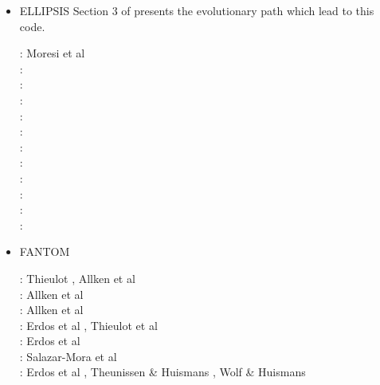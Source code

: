 \begin{itemize}
\item {\codefont ELLIPSIS} 
Section 3 of \cite{qums07} presents the evolutionary path which lead to this code.

{\small
\noindent
\twothousandone: Moresi et al \cite{modm01}\\
\twothousandthree: \cite{modm03}\cite{wibm03}\cite{mumc03}\cite{wemv03}\cite{onmo03}\cite{onml03}\\
\twothousandfour: \cite{wijns2004}\\
\twothousandfive: \cite{wiwg05}\cite{onml05}\cite{onmj05}\\
\twothousandsix: \cite{onmm06} \\
\twothousandseven: \cite{moql07}\cite{gewm07}\cite{dyrm07}\cite{onlm07}\\
\twothousandeight: \cite{onlg08}\\
\twothousandnine: \cite{onlj09}\\
\twothousandten: \cite{pyeg10}\\
\twothousandeleven: \cite{legu11}\\
\twothousandtwelve: \cite{lega12}\\
\twothousandfourteen: \cite{recf14}
}

\item FANTOM 

\begin{scriptsize}
\noindent
\twothousandeleven:
Thieulot \cite{thie11}, Allken et al \cite{alht11}\\
\twothousandtwelve:
Allken et al \cite{alht12}\\
\twothousandthirteen:
Allken et al \cite{alhf13}\\
\twothousandfourteen:
Erdos et al \cite{erhv14}, Thieulot et al \cite{thsh14}\\
\twothousandfifteen:
Erdos et al \cite{erhv15}\\
\twothousandeighteen:
Salazar-Mora et al \cite{sahf18}\\
\twothousandnineteen:
Erdos et al \cite{erhv19}, Theunissen \& Huismans \cite{thhu19}, Wolf \& Huismans \cite{wohu19}\\
\end{scriptsize}


\end{itemize}
